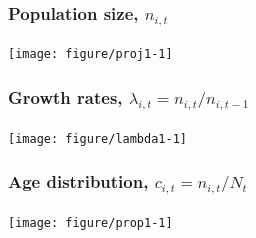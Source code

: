 \documentclass[color=usenames,dvipsnames]{beamer}\usepackage[]{graphicx}\usepackage[]{xcolor}
\begin{document}
\begin{frame}[fragile]
  \frametitle{Population size, $n_{i,t}$}

\vspace{-0.9cm}
\begin{center}
  \texttt{[image: figure/proj1-1]}
\end{center}
\end{frame}




\begin{frame}[fragile]
  \frametitle{Growth rates, $\lambda_{i,t}=n_{i,t}/n_{i,t-1}$}

\vspace{-0.9cm}
\begin{center}
  \texttt{[image: figure/lambda1-1]}
\end{center}
\end{frame}




\begin{frame}[fragile]
  \frametitle{Age distribution, $c_{i,t}=n_{i,t}/N_t$}

\vspace{-0.9cm}
\begin{center}
  \texttt{[image: figure/prop1-1]}
\end{center}
\end{frame}
\end{document}
